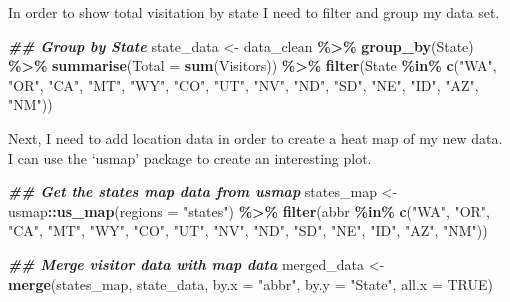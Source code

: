 \documentclass[
]{article}
\newenvironment{Shaded}{\begin{snugshade}}{\end{snugshade}}
\newcommand{\AttributeTok}[1]{\textcolor[rgb]{0.13,0.29,0.53}{#1}}
\newcommand{\ConstantTok}[1]{\textcolor[rgb]{0.56,0.35,0.01}{#1}}
\newcommand{\DocumentationTok}[1]{\textcolor[rgb]{0.56,0.35,0.01}{\textbf{\textit{#1}}}}
\newcommand{\FunctionTok}[1]{\textcolor[rgb]{0.13,0.29,0.53}{\textbf{#1}}}
\newcommand{\NormalTok}[1]{#1}
\newcommand{\OtherTok}[1]{\textcolor[rgb]{0.56,0.35,0.01}{#1}}
\newcommand{\SpecialCharTok}[1]{\textcolor[rgb]{0.81,0.36,0.00}{\textbf{#1}}}
\newcommand{\StringTok}[1]{\textcolor[rgb]{0.31,0.60,0.02}{#1}}
\begin{document}
In order to show total visitation by state I need to filter and group my
data set.

\begin{Shaded}
\begin{Highlighting}[]
  \DocumentationTok{\#\# Group by State}
\NormalTok{state\_data }\OtherTok{\textless{}{-}}\NormalTok{ data\_clean }\SpecialCharTok{\%\textgreater{}\%}
  \FunctionTok{group\_by}\NormalTok{(State) }\SpecialCharTok{\%\textgreater{}\%}
  \FunctionTok{summarise}\NormalTok{(}\AttributeTok{Total =} \FunctionTok{sum}\NormalTok{(Visitors)) }\SpecialCharTok{\%\textgreater{}\%}
  \FunctionTok{filter}\NormalTok{(State }\SpecialCharTok{\%in\%} \FunctionTok{c}\NormalTok{(}\StringTok{"WA"}\NormalTok{, }\StringTok{"OR"}\NormalTok{, }\StringTok{"CA"}\NormalTok{, }\StringTok{"MT"}\NormalTok{, }\StringTok{"WY"}\NormalTok{, }
                      \StringTok{"CO"}\NormalTok{, }\StringTok{"UT"}\NormalTok{, }\StringTok{"NV"}\NormalTok{, }\StringTok{"ND"}\NormalTok{, }\StringTok{"SD"}\NormalTok{, }
                      \StringTok{"NE"}\NormalTok{, }\StringTok{"ID"}\NormalTok{, }\StringTok{"AZ"}\NormalTok{, }\StringTok{"NM"}\NormalTok{))}
\end{Highlighting}
\end{Shaded}

Next, I need to add location data in order to create a heat map of my
new data. I can use the `usmap' package to create an interesting plot.

\begin{Shaded}
\begin{Highlighting}[]
  \DocumentationTok{\#\# Get the states map data from usmap}
\NormalTok{states\_map }\OtherTok{\textless{}{-}}\NormalTok{ usmap}\SpecialCharTok{::}\FunctionTok{us\_map}\NormalTok{(}\AttributeTok{regions =} \StringTok{"states"}\NormalTok{) }\SpecialCharTok{\%\textgreater{}\%}
  \FunctionTok{filter}\NormalTok{(abbr }\SpecialCharTok{\%in\%} \FunctionTok{c}\NormalTok{(}\StringTok{"WA"}\NormalTok{, }\StringTok{"OR"}\NormalTok{, }\StringTok{"CA"}\NormalTok{, }\StringTok{"MT"}\NormalTok{, }\StringTok{"WY"}\NormalTok{, }\StringTok{"CO"}\NormalTok{, }
                     \StringTok{"UT"}\NormalTok{, }\StringTok{"NV"}\NormalTok{, }\StringTok{"ND"}\NormalTok{, }\StringTok{"SD"}\NormalTok{, }\StringTok{"NE"}\NormalTok{, }\StringTok{"ID"}\NormalTok{, }
                     \StringTok{"AZ"}\NormalTok{, }\StringTok{"NM"}\NormalTok{))}

  \DocumentationTok{\#\# Merge visitor data with map data}
\NormalTok{merged\_data }\OtherTok{\textless{}{-}} \FunctionTok{merge}\NormalTok{(states\_map, state\_data, }\AttributeTok{by.x =} \StringTok{"abbr"}\NormalTok{, }
                     \AttributeTok{by.y =} \StringTok{"State"}\NormalTok{, }\AttributeTok{all.x =} \ConstantTok{TRUE}\NormalTok{)}
\end{Highlighting}
\end{Shaded}
\end{document}
